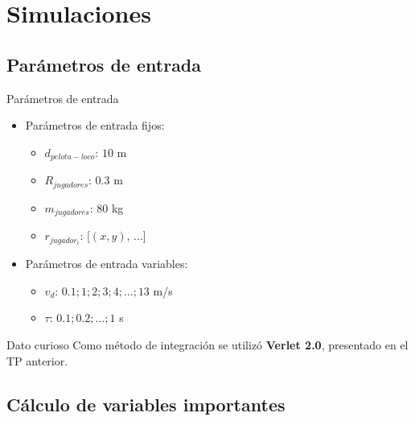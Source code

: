 \documentclass{beamer}
\begin{document}
    \section{Simulaciones}

        \subsection{Parámetros de entrada}

            \begin{frame}{Parámetros de entrada}
                \begin{itemize}
                    \item Parámetros de entrada fijos:
                    \begin{itemize}
                        \item $d_{pelota-loco}$: \alert{$10$ m}
                        \item $R_{jugadores}$: \alert{$0.3$ m}
                        \item $m_{jugadores}$: \alert{$80$ kg}
                        \item $r_{jugador_i}$: \alert{[$(x, y)$, ...]}
                    \end{itemize}
                    \item Parámetros de entrada variables:
                    \begin{itemize}
                        \item $v_d$: \alert{${0.1; 1; 2; 3; 4; ...; 13}$ m/s}
                        \item $\tau$: \alert{$0.1; 0.2; ...; 1$ s}
                    \end{itemize}
                \end{itemize}
                \begin{block}{Dato curioso}
                    Como método de integración se utilizó \textbf{Verlet 2.0}, presentado en el TP anterior.
                \end{block}
            \end{frame}

        \subsection{Cálculo de variables importantes}
\end{document}
